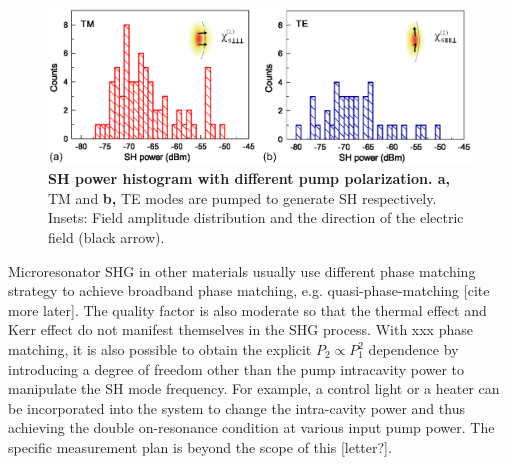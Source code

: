 \documentclass[a4paper,8pt,hyperref, twocolumn]{article}
\begin{document}



\begin{figure}[!ht]
\includegraphics[width=18cm]{Fig3.eps}
\caption{\textbf{SH power histogram with different pump polarization. a, } TM and \textbf{b,} TE modes are pumped to generate SH respectively. Insets: Field amplitude distribution and the direction of the electric field (black arrow).}
\label{pic:Fig3}
\end{figure}

Microresonator SHG in other materials usually use different phase matching strategy to achieve broadband phase matching, e.g. quasi-phase-matching [cite more later]. The quality factor is also moderate so that the thermal effect and Kerr effect do not manifest themselves in the SHG process. 
With xxx phase matching, it is also possible to obtain the explicit $P_2 \propto P_1^2$ dependence by introducing a degree of freedom other than the pump intracavity power to manipulate the SH mode frequency. 
For example, a control light or a heater can be incorporated into the system to change the intra-cavity power and thus achieving the double on-resonance condition at various input pump power. 
The specific measurement plan is beyond the scope of this [letter?].%
\end{document}

